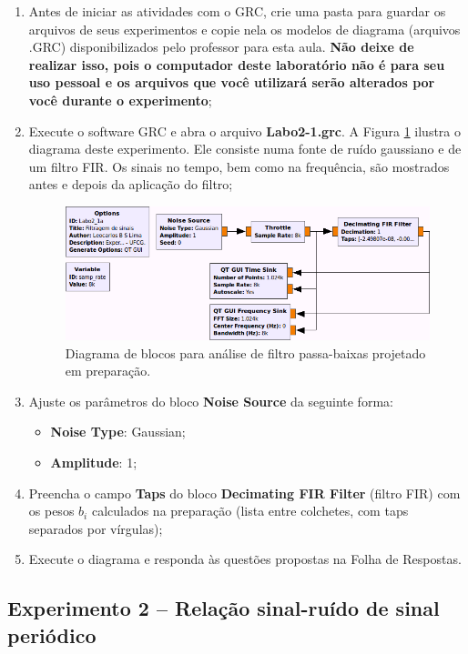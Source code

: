 \documentclass[12pt,addpoints]{exam}
\newcommand{\myscale}{0.4}
\begin{document}
\begin{enumerate}
    \item Antes de iniciar as atividades com o GRC, crie uma pasta para guardar os arquivos de seus experimentos e copie nela os modelos de diagrama (arquivos .GRC) disponibilizados pelo professor para esta aula. \textbf{Não deixe de realizar isso, pois o computador deste laboratório não é para seu uso pessoal e os arquivos que você utilizará serão alterados por você durante o experimento};
    \item Execute o software GRC e abra o arquivo \textbf{Labo2-1.grc}. A Figura \ref{fig:GRC_2-1} ilustra o diagrama deste experimento. Ele consiste numa fonte de ruído gaussiano e de um filtro FIR. Os sinais no tempo, bem como na frequência, são mostrados antes e depois da aplicação do filtro;
    \begin{figure}[htb]
        \centering
        \includegraphics[scale=\myscale]{./Figuras/GRC_2-1}
        \caption{Diagrama de blocos para análise de filtro passa-baixas projetado em preparação.} 
        \label{fig:GRC_2-1}
    \end{figure}
    \item Ajuste os parâmetros do bloco \textbf{Noise Source} da seguinte forma:
    \begin{itemize}
        \item \textbf{Noise Type}: Gaussian;
        \item \textbf{Amplitude}: 1;
    \end{itemize}
    \item Preencha o campo \textbf{Taps} do bloco \textbf{Decimating FIR Filter} (filtro FIR) com os pesos $b_i$ calculados na preparação (lista entre colchetes, com taps separados por vírgulas);
    \item Execute o diagrama e responda às questões propostas na Folha de Respostas.
\end{enumerate}

\subsection{Experimento 2 -- Relação sinal-ruído de sinal periódico}
\end{document}
